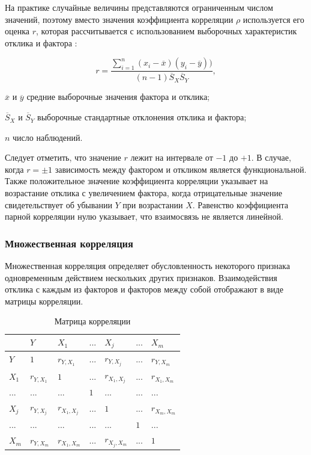На практике случайные величины представляются ограниченным числом значений, поэтому вместо значения коэффициента корреляции $\rho$ используется его оценка $r$, которая рассчитывается с использованием выборочных характеристик отклика и фактора \cite{corelMethod}:

\begin{equation}
\label{eq:corelMark}
r = \frac{\sum_{i = 1}^{n}(x_i - \overline{x})(y_i - \overline{y}))}{(n - 1)\overline{S}_X \overline{S}_Y},
\end{equation}
\begin{eqexpl}[20mm]
\item{$\overline{x}$ и $\overline{y}$} средние выборочные значения фактора и отклика;
\item{$\overline{S}_X$ и $\overline{S}_Y$} выборочные стандартные отклонения отклика и фактора;
\item{$n$} число наблюдений.
\end{eqexpl}

Следует отметить, что значение $r$ лежит на интервале от $-1$ до $+1$. В случае, когда $r=\pm1$ зависимость между фактором и откликом является функциональной. Также положительное значение коэффициента корреляции указывает на возрастание отклика с увеличением фактора, когда отрицательные значение свидетельствует об убывании $Y$ при возрастании $X$. Равенство коэффициента парной корреляции нулю указывает, что взаимосвязь не является линейной. \cite{corelMethod}

\subsubsection{Множественная корреляция}
Множественная корреляция определяет обусловленность некоторого признака одновременным действием нескольких других признаков. Взаимодействия отклика с каждым из факторов и факторов между собой отображают в виде матрицы корреляции. \cite{corelMethod}

\begin{table}[H]
\begin{center}
\caption{\label{table: corelMatrix} Матрица корреляции}
\begin{tabular}{l||llllll}
      & $Y$         & $X_1$         & $...$ & $X_j$          & $...$ & $X_m$             \\ \hline\hline
$Y$   & $1$         & $r_{Y,X_1}$   & $...$ & $r_{Y,X_j}$    & $...$ & $r_{Y,X_m}$    \\
$X_1$ & $r_{Y,X_1}$ & $1 $          & $...$ & $r_{X_1,X_j}$  & $...$ & $r_{X_1,X_m}$ \\
$...$ & $...$       & $...$         & $1$   & $...$          & $...$ & $...$              \\
$X_j$ & $r_{Y,X_j}$ & $r_{X_1,X_j}$ & $...$ & $1$            & $...$ & $r_{X_m,X_m}$ \\
$...$ & $...$       & $...$         & $...$ & $...$          & $1$   & $...$              \\
$X_m$ & $r_{Y,X_m}$ & $r_{X_1,X_m}$ & $...$ & $r_{X_j,X_m}$  & $...$ & $1$               
\end{tabular}
\end{center}
\end{table}

